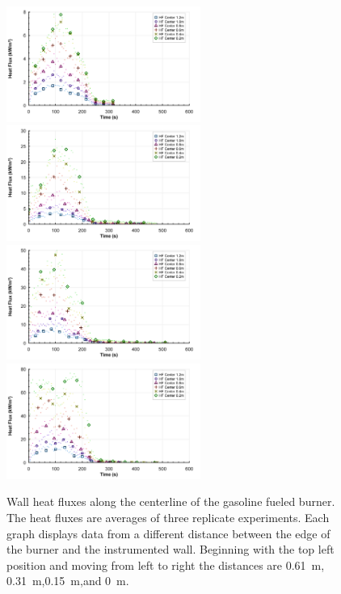 \documentclass[twoside]{uocthesis}
\begin{document}
{{\begin{figure}[p]
	\centering
	\includegraphics[width=2.5in]{../Figures/HF_Center_TWGas_0_61m_RepsAvg}
	\includegraphics[width=2.5in]{../Figures/HF_Center_TWGas_0_31m_RepsAvg}\\
	\includegraphics[width=2.5in]{../Figures/HF_Center_TWGas_0_15m_RepsAvg}
	\includegraphics[width=2.5in]{../Figures/HF_Center_TWGas_0m_RepsAvg}\\
	\caption[Wall heat fluxes along the centerline of the gasoline fueled burner]{Wall heat fluxes along the centerline of the gasoline fueled burner.  The heat fluxes are averages of three replicate experiments. Each graph displays data from a different distance between the edge of the burner and the instrumented wall.  Beginning with the top left position and moving from left to right the distances are 0.61~m, 0.31~m,0.15~m,and 0~m.}
	\label{IW_HFC_TWGAS}
\end{figure}

}}
\end{document}
